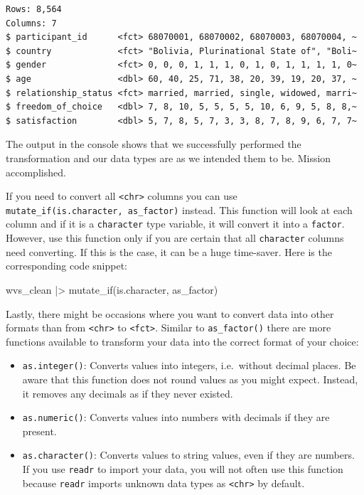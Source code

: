 \documentclass[
  letterpaper,
]{krantz}
\makeatletter
\newenvironment{Shaded}{\begin{snugshade}}{\end{snugshade}}
\newcommand{\FunctionTok}[1]{\textcolor[rgb]{0.28,0.35,0.67}{#1}}
\newcommand{\NormalTok}[1]{\textcolor[rgb]{0.00,0.23,0.31}{#1}}
\newcommand{\SpecialCharTok}[1]{\textcolor[rgb]{0.37,0.37,0.37}{#1}}
\newenvironment{kframe}{%
\medskip{}
\setlength{\fboxsep}{.8em}
 \def\at@end@of@kframe{}%
 \ifinner\ifhmode%
  \def\at@end@of@kframe{\end{minipage}}%
  \begin{minipage}{\columnwidth}%
 \fi\fi%
 \def\FrameCommand##1{\hskip\@totalleftmargin \hskip-\fboxsep
 \colorbox{shadecolor}{##1}\hskip-\fboxsep
     \hskip-\linewidth \hskip-\@totalleftmargin \hskip\columnwidth}%
 \MakeFramed {\advance\hsize-\width
   \@totalleftmargin\z@ \linewidth\hsize
   \@setminipage}}%
 {\par\unskip\endMakeFramed%
 \at@end@of@kframe}
\renewenvironment{Shaded}{\begin{kframe}}{\end{kframe}}
\makeatother
\begin{document}
\begin{verbatim}
Rows: 8,564
Columns: 7
$ participant_id      <fct> 68070001, 68070002, 68070003, 68070004, ~
$ country             <fct> "Bolivia, Plurinational State of", "Boli~
$ gender              <fct> 0, 0, 0, 1, 1, 1, 0, 1, 0, 1, 1, 1, 1, 0~
$ age                 <dbl> 60, 40, 25, 71, 38, 20, 39, 19, 20, 37, ~
$ relationship_status <fct> married, married, single, widowed, marri~
$ freedom_of_choice   <dbl> 7, 8, 10, 5, 5, 5, 5, 10, 6, 9, 5, 8, 8,~
$ satisfaction        <dbl> 5, 7, 8, 5, 7, 3, 3, 8, 7, 8, 9, 6, 7, 7~
\end{verbatim}

The output in the console shows that we successfully performed the
transformation and our data types are as we intended them to be. Mission
accomplished.

If you need to convert all \texttt{\textless{}chr\textgreater{}} columns
you can use \texttt{mutate\_if(is.character,\ as\_factor)} instead. This
function will look at each column and if it is a \texttt{character} type
variable, it will convert it into a \texttt{factor}. However, use this
function only if you are certain that all \texttt{character} columns
need converting. If this is the case, it can be a huge time-saver. Here
is the corresponding code snippet:

\begin{Shaded}
\begin{Highlighting}[]
\NormalTok{wvs\_clean }\SpecialCharTok{|\textgreater{}}
  \FunctionTok{mutate\_if}\NormalTok{(is.character, as\_factor)}
\end{Highlighting}
\end{Shaded}

Lastly, there might be occasions where you want to convert data into
other formats than from \texttt{\textless{}chr\textgreater{}} to
\texttt{\textless{}fct\textgreater{}}. Similar to \texttt{as\_factor()}
there are more functions available to transform your data into the
correct format of your choice:

\begin{itemize}
\item
  \texttt{as.integer()}: Converts values into integers, i.e.~without
  decimal places. Be aware that this function does not round values as
  you might expect. Instead, it removes any decimals as if they never
  existed.
\item
  \texttt{as.numeric()}: Converts values into numbers with decimals if
  they are present.
\item
  \texttt{as.character()}: Converts values to string values, even if
  they are numbers. If you use \texttt{readr} to import your data, you
  will not often use this function because \texttt{readr} imports
  unknown data types as \texttt{\textless{}chr\textgreater{}} by
  default.
\end{itemize}
\end{document}
